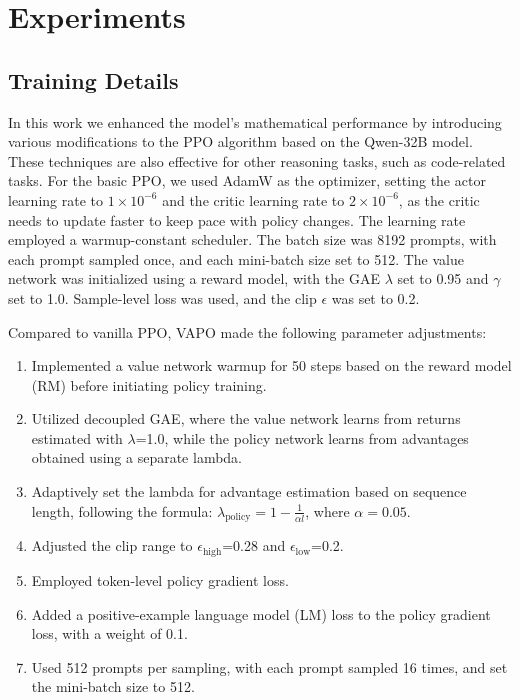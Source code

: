 \section{Experiments}

\subsection{Training Details}
In this work we enhanced the model's mathematical performance by introducing various modifications to the PPO algorithm based on the Qwen-32B model. These techniques are also effective for other reasoning tasks, such as code-related tasks. For the basic PPO, we used AdamW as the optimizer, setting the actor learning rate to \(1 \times 10^{-6}\) and the critic learning rate to \(2 \times 10^{-6}\), as the critic needs to update faster to keep pace with policy changes. The learning rate employed a warmup-constant scheduler. The batch size was 8192 prompts, with each prompt sampled once, and each mini-batch size set to 512. The value network was initialized using a reward model, with the GAE $\lambda$ set to 0.95 and $\gamma$ set to 1.0. Sample-level loss was used, and the clip $\epsilon$ was set to 0.2.

Compared to vanilla PPO, VAPO made the following parameter adjustments:
\begin{enumerate}
\item Implemented a value network warmup for 50 steps based on the reward model (RM) before initiating policy training.
\item Utilized decoupled GAE, where the value network learns from returns estimated with $\lambda$=1.0, while the policy network learns from advantages obtained using a separate lambda.
\item Adaptively set the lambda for advantage estimation based on sequence length, following the formula: $\lambda_{\text{policy}} = 1-\frac{1}{\alpha l}$, where $\alpha=0.05$.
\item Adjusted the clip range to $\epsilon_\text{high}$=0.28 and $\epsilon_
\text{low}$=0.2.
\item Employed token-level policy gradient loss.
\item Added a positive-example language model (LM) loss to the policy gradient loss, with a weight of 0.1.
\item Used 512 prompts per sampling, with each prompt sampled 16 times, and set the mini-batch size to 512.
\end{enumerate}

